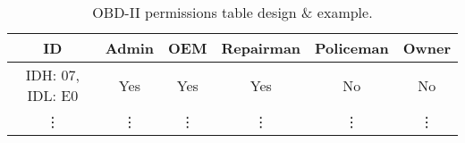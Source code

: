 \begin{table}[]
	\begin{tabular}{|c|c|c|c|c|c|}
		\hline
		\rowcolor[HTML]{9B9B9B} ID & Admin & OEM & Repairman & Policeman & Owner \\ \hline
		\cellcolor[HTML]{9B9B9B} IDH: 07, IDL: E0 & Yes & Yes & Yes & No & No \\ \hline
		\cellcolor[HTML]{9B9B9B} \vdots & \vdots & \vdots & \vdots & \vdots & \vdots
	\end{tabular}
	\caption{OBD-II permissions table design \& example.}
	\label{table:2}
\end{table}

